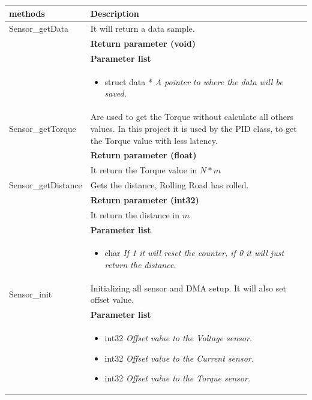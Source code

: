 \begin{table}[H]
	\centering
	\begin{tabular}{|p{5 cm}|p{10 cm}|}
		\hline
		\textbf{methods} & \textbf{Description} \\ \hline
		
		Sensor\_getData
		& It will return a data sample.
		\\ & \textbf{Return parameter (void)}
		\\ & \textbf{Parameter list}
		\\ & \begin{itemize}
			\item {\large struct data *}
			\subitem \textit{A pointer to where the data will be saved.}
		\end{itemize}
		\\ \hline
		
		Sensor\_getTorque\fxnote{Skal have fixet - hilsten mig selv}
		& Are used to get the Torque without calculate all others values. In this project it is used by the PID class, to get the Torque value with less latency.
		\\ & \textbf{Return parameter (float)}
		\\ & It return the Torque value in $ N*m $ 
		\\ \hline
		
		Sensor\_getDistance
		& Gets the distance, Rolling Road has rolled. 
		\\ & \textbf{Return parameter (int32)}
		\\ & It return the distance in $ m $
		\\ & \textbf{Parameter list}
		\\ & \begin{itemize}
			\item {\large char}
			\subitem \textit{If 1 it will reset the counter, if 0 it will just return the distance.}
		\end{itemize}
		\\ \hline
			
			Sensor\_init
			& Initializing all sensor and DMA setup. It will also set offset value.   
			\\ & \textbf{Parameter list}
			\\ & \begin{itemize}
				\item {\large int32}
				\subitem \textit{Offset value to the Voltage sensor.}
				\item {\large int32}
				\subitem \textit{Offset value to the Current sensor.}
				\item {\large int32}
				\subitem \textit{Offset value to the Torque sensor.}
			\end{itemize}
			\\ \hline
			

\end{tabular}
\end{table}
